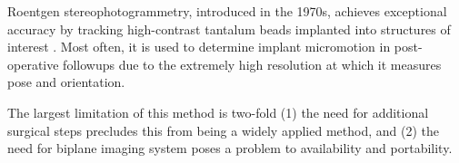 Roentgen stereophotogrammetry, introduced in the 1970s, achieves exceptional accuracy by tracking high-contrast tantalum beads implanted into structures of interest \cite{selvikRoentgenStereophotogrammetryMethod1989}.
Most often, it is used to determine implant micromotion in post-operative followups due to the extremely high resolution at which it measures pose and orientation.

The largest limitation of this method is two-fold (1) the need for additional surgical steps precludes this from being a widely applied method, and (2) the need for biplane imaging system poses a problem to availability and portability.


